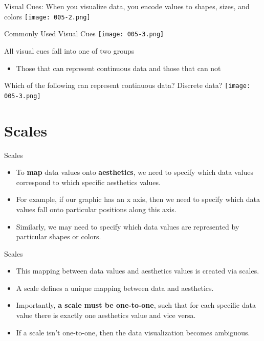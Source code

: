 \documentclass[10pt]{beamer}\usepackage[]{graphicx}\usepackage[]{color}
\begin{document}
	\begin{frame}{Visual Cues: When you visualize data, you encode values to shapes, sizes, and colors}
		\centering
	\texttt{[image: 005-2.png]}
\end{frame}

	\begin{frame}{Commonly Used Visual Cues}
	\centering
	\texttt{[image: 005-3.png]}
\end{frame}

	\begin{frame}{All visual cues fall into one of two groups}
\begin{itemize}
	\item Those that can represent continuous data and those that can not
\end{itemize}
\end{frame}


	\begin{frame}{Which of the following can represent continuous data? Discrete data?}
	\centering
	\texttt{[image: 005-3.png]}
\end{frame}


\section{Scales}

\begin{frame}{Scales}
	\begin{itemize}
		\item To \textbf{map} data values onto \textbf{aesthetics}, we need to specify which data values correspond to which specific aesthetics values. \pause 
		\item For example, if our graphic has an x axis, then we need to specify which data values fall onto particular positions along this axis. \pause 
		\item Similarly, we may need to specify which data values are represented by particular shapes or colors. 
		
	\end{itemize}
\end{frame}


	\begin{frame}{Scales}
	\begin{itemize}
		\item This mapping between data values and aesthetics values is created via scales. 
		\item A scale defines a unique mapping between data and aesthetics.
		\item Importantly, \textbf{a scale must be one-to-one}, such that for each specific data value there is exactly one aesthetics value and vice versa. 
		\item If a scale isn't one-to-one, then the data visualization becomes ambiguous.		
	\end{itemize}
\end{frame}
\end{document}
